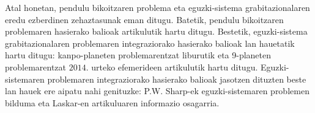Atal honetan, pendulu bikoitzaren problema eta eguzki-sistema grabitazionalaren eredu ezberdinen zehaztasunak eman ditugu. Batetik, pendulu bikoitzaren problemaren hasierako balioak \cite{Dumitru} artikulutik hartu ditugu. Bestetik, eguzki-sistema grabitazionalaren problemaren integraziorako hasierako balioak lan hauetatik hartu ditugu: kanpo-planeten problemarentzat \cite{Hairer2006} liburutik eta 9-planeten problemarentzat $2014.$ urteko efemerideen \cite{Folkner2014} artikulutik hartu ditugu. Eguzki-sistemaren problemaren integraziorako hasierako balioak jasotzen dituzten beste lan hauek ere aipatu nahi genituzke: P.W. Sharp-ek eguzki-sistemaren problemen bilduma \cite{Sharp2001} eta Laskar-en \cite{Laskar2009} artikuluaren informazio osagarria.